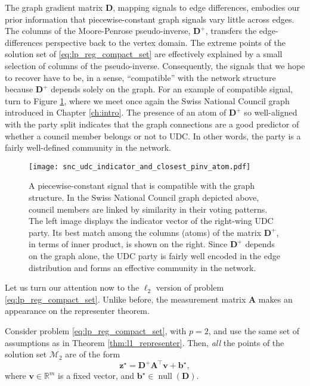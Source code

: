 The graph gradient matrix $\mathbf{D}$, mapping signals to edge differences, embodies our prior information that piecewise-constant graph signals vary little across edges. The columns of the  Moore-Penrose pseudo-inverse, $\mathbf{D}^+$, transfers the edge-differences perspective back to the vertex domain. The extreme points of the solution set of \eqref{eq:lp_reg_compact_set} are effectively explained by a small selection of columns of the pseudo-inverse. Consequently, the signals that we hope to recover have to be, in a sense, ``compatible'' with the network structure because $\mathbf{D}^+$ depends solely on the graph. For an example of compatible signal, turn to Figure \ref{fig:snc_udc_indicator_and_closest_pinv_atom}, where we meet once again the Swiss National Council graph introduced in Chapter \ref{ch:intro}. The presence of an atom of $\mathbf{D}^+$ so well-aligned with the party split indicates that the graph connections are a good predictor of whether a council member belongs or not to UDC. In other words, the party is a fairly well-defined community in the network.

\clearpage

\begin{figure}[H]
    \centering
    \texttt{[image: snc\_udc\_indicator\_and\_closest\_pinv\_atom.pdf]}
    \caption[A piecewise-constant signal that is compatible with the graph structure]{A piecewise-constant signal that is compatible with the graph structure. In the Swiss National Council graph depicted above, council members are linked by similarity in their voting patterns. The left image displays the indicator vector of the right-wing UDC party. Its best match among the columns (atoms) of the matrix $\mathbf{D}^+$, in terms of inner product, is shown on the right. Since $\mathbf{D}^+$ depends on the graph alone, the UDC party is fairly well encoded in the edge distribution and forms an effective community in the network.}
    \label{fig:snc_udc_indicator_and_closest_pinv_atom}
\end{figure}

Let us turn our attention now to the $\ell_2$ version of problem \eqref{eq:lp_reg_compact_set}. Unlike before, the measurement matrix $\mathbf{A}$ makes an appearance on the representer theorem.

\begin{theorem}\label{thm:l2_representer}
    Consider problem \eqref{eq:lp_reg_compact_set}, with $p=2$, and use the same set of assumptions as in Theorem \ref{thm:l1_representer}. Then, \emph{all} the points of the solution set $\mathcal{M}_2$ are of the form
    \begin{equation}
        \mathbf{z}^\star = \mathbf{D}^+ \mathbf{A}^\top \mathbf{v} + \mathbf{b}^\star,
    \end{equation}
    where $\mathbf{v} \in \mathbb{R}^{m}$ is a fixed vector, and $\mathbf{b}^\star \in \operatorname{null} \left ( \mathbf{D} \right )$.
\end{theorem}

